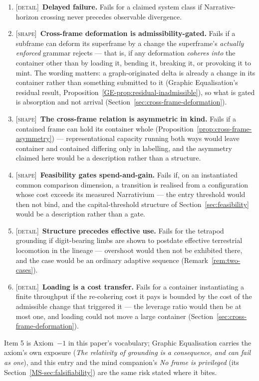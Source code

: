 \documentclass[11pt,a4paper]{article}
\theoremstyle{remark}
\begin{document}
\begin{enumerate}[leftmargin=*]
\item \textsc{[detail]}~\textbf{Delayed failure.} Fails for a claimed system class if Narrative-horizon crossing never precedes observable divergence.
\item \textsc{[shape]}~\textbf{Cross-frame deformation is admissibility-gated.} Fails if a subframe can deform its superframe by a change the superframe's \emph{actually enforced} grammar rejects --- that is, if any deformation \emph{coheres into} the container other than by loading it, bending it, breaking it, or provoking it to mint. The wording matters: a graph-originated delta is already a change in its container rather than something submitted to it (Graphic Equalisation's residual result, Proposition~\ref{GE-prop:residual-inadmissible}), so what is gated is absorption and not arrival (Section~\ref{sec:cross-frame-deformation}).
\item \textsc{[shape]}~\textbf{The cross-frame relation is asymmetric in kind.} Fails if a contained frame can hold its container whole (Proposition~\ref{prop:cross-frame-asymmetry}) --- representational capacity running both ways would leave container and contained differing only in labelling, and the asymmetry claimed here would be a description rather than a structure.
\item \textsc{[shape]}~\textbf{Feasibility gates spend-and-gain.} Fails if, on an instantiated common comparison dimension, a transition is realised from a configuration whose cost exceeds its measured Narrativium --- the entry threshold would then not bind, and the capital-threshold structure of Section~\ref{sec:feasibility} would be a description rather than a gate.
\item \textsc{[detail]}~\textbf{Structure precedes effective use.} Fails for the tetrapod grounding if digit-bearing limbs are shown to postdate effective terrestrial locomotion in the lineage --- overshoot would then not be exhibited there, and the case would be an ordinary adaptive sequence (Remark~\ref{rem:two-cases}).
\item \textsc{[detail]}~\textbf{Loading is a cost transfer.} Fails for a container instantiating a finite throughput if the re-cohering cost it pays is bounded by the cost of the admissible change that triggered it --- the leverage ratio would then be at most one, and loading could not move a large container (Section~\ref{sec:cross-frame-deformation}).
\end{enumerate}

\noindent Item 5 is Axiom~$-1$ in this paper's vocabulary; Graphic Equalisation carries the axiom's
own exposure (\emph{The relativity of grounding is a consequence, and can fail as one}), and this
entry and the mind companion's \emph{No frame is privileged} (its
Section~\ref{MS-sec:falsifiability}) are the same risk stated where it bites.
\end{document}
